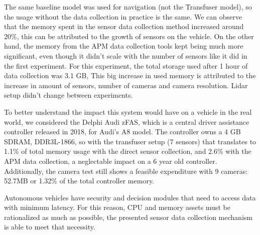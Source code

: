\begin{table}[!ht]
\centering
{}
\caption{Total memory and CPU comparison between data collection methods for the Transfuser agent. Total sensor count in the CARLA simulator: 7. Simulation server is not accounted for in used memory.}
\label{tab:table2}
\end{table}

The same baseline model was used for navigation (not the Transfuser model), so the usage without the data collection in practice is the same. We can observe that the memory spent in the sensor data collection method increased around 20\%, this can be attributed to the growth of sensors on the vehicle. On the other hand, the memory from the APM data collection tools kept being much more significant, even though it didn't scale with the number of sensors like it did in the first experiment. For this experiment, the total storage used after 1 hour of data collection was 3.1 GB, This big increase in used memory is attributed to the increase in amount of sensors, number of cameras and camera resolution. Lidar setup didn't change between experiments.

To better understand the impact this system would have on a vehicle in the real world, we considered the Delphi Audi zFAS, which is a central driver assistance controller released in 2018, for Audi's A8 model. The controller owns a 4 GB SDRAM, DDR3L-1866, so with the transfuser setup (7 sensors) that translates to 1.1\% of total memory usage with the direct sensor collection, and 2.6\% with the APM data collection, a neglectable impact on a 6 year old controller. Additionally, the camera test still shows a feasible expenditure with 9 cameras: 52.7MB or 1.32\% of the total controller memory.

Autonomous vehicles have security and decision modules that need to access data with minimum latency. For this reason, CPU and memory assets must be rationalized as much as possible, the presented sensor data collection mechanism is able to meet that necessity.

